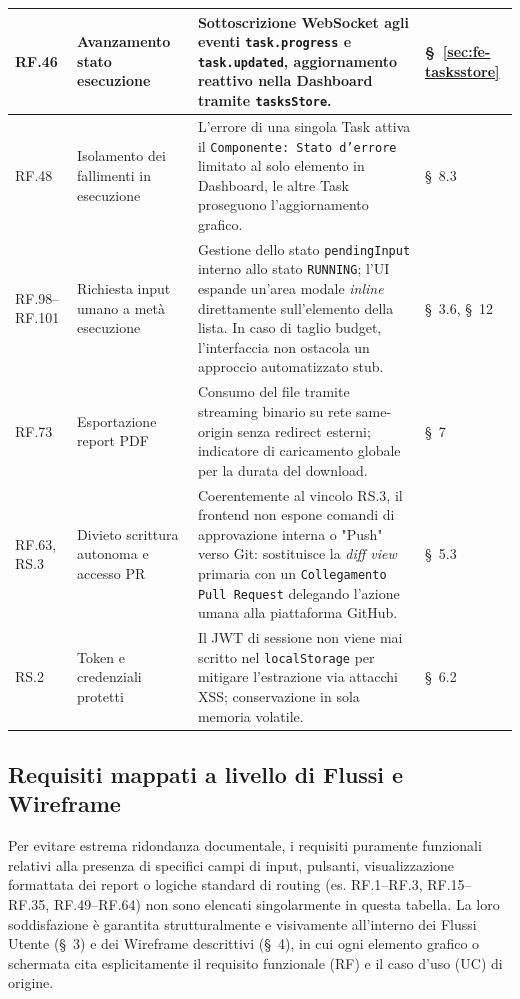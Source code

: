 \documentclass[11pt,a4paper]{article}
\begin{document}
\begin{center}
\begin{xltabular}{\textwidth}{|l|X|X|l|}
RF.46 & Avanzamento stato esecuzione & Sottoscrizione WebSocket agli eventi \texttt{task.progress} e \texttt{task.updated}, aggiornamento reattivo nella Dashboard tramite \texttt{tasksStore}. & \S~\ref{sec:fe-tasksstore} \\ \hline
RF.48 & Isolamento dei fallimenti in esecuzione & L'errore di una singola Task attiva il \texttt{Componente: Stato d'errore} limitato al solo elemento in Dashboard, le altre Task proseguono l'aggiornamento grafico. & \S~8.3 \\ \hline
RF.98--RF.101 & Richiesta input umano a metà esecuzione & Gestione dello stato \texttt{pendingInput} interno allo stato \texttt{RUNNING}; l'UI espande un'area modale \emph{inline} direttamente sull'elemento della lista. In caso di taglio budget, l'interfaccia non ostacola un approccio automatizzato stub. & \S~3.6, \S~12 \\ \hline
RF.73 & Esportazione report PDF & Consumo del file tramite streaming binario su rete same-origin senza redirect esterni; indicatore di caricamento globale per la durata del download. & \S~7 \\ \hline
RF.63, RS.3 & Divieto scrittura autonoma e accesso PR & Coerentemente al vincolo RS.3, il frontend non espone comandi di approvazione interna o "Push" verso Git: sostituisce la \emph{diff view} primaria con un \texttt{Collegamento Pull Request} delegando l'azione umana alla piattaforma GitHub. & \S~5.3 \\ \hline
RS.2 & Token e credenziali protetti & Il JWT di sessione non viene mai scritto nel \texttt{localStorage} per mitigare l'estrazione via attacchi XSS; conservazione in sola memoria volatile. & \S~6.2 \\ \hline
\end{xltabular}
\end{center}

\subsection{Requisiti mappati a livello di Flussi e Wireframe}

Per evitare estrema ridondanza documentale, i requisiti puramente funzionali relativi alla presenza di specifici campi di input, pulsanti, visualizzazione formattata dei report o logiche standard di routing (es. RF.1--RF.3, RF.15--RF.35, RF.49--RF.64) non sono elencati singolarmente in questa tabella. La loro soddisfazione è garantita strutturalmente e visivamente all'interno dei Flussi Utente (\S~3) e dei Wireframe descrittivi (\S~4), in cui ogni elemento grafico o schermata cita esplicitamente il requisito funzionale (RF) e il caso d'uso (UC) di origine.
\end{document}
